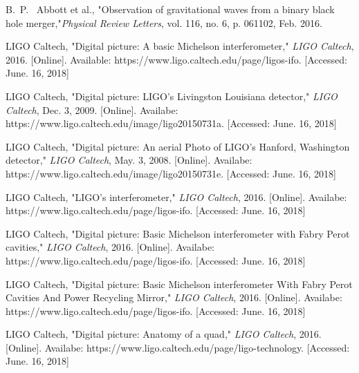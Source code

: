 \documentclass[journal,comsoc,twoside]{IEEEtran}
\begin{document}
%
%
%
\begin{thebibliography}{1}

B.~P.~ Abbott et al., "Observation of gravitational waves from a binary black hole merger,"\emph{Physical Review Letters}, vol. 116, no. 6, p. 061102, Feb. 2016.

LIGO Caltech, "Digital picture: A basic Michelson interferometer," \emph{LIGO Caltech}, 2016. [Online]. Available: https://www.ligo.caltech.edu/page/ligos-ifo. [Accessed: June. 16, 2018]

LIGO Caltech, "Digital picture: LIGO's Livingston Louisiana detector," \emph{LIGO Caltech}, Dec. 3, 2009. [Online]. Availabe: https://www.ligo.caltech.edu/image/ligo20150731a. [Accessed: June. 16, 2018]

LIGO Caltech, "Digital picture: An aerial Photo of LIGO's Hanford, Washington detector," \emph{LIGO Caltech}, May. 3, 2008. [Online]. Availabe: https://www.ligo.caltech.edu/image/ligo20150731e. [Accessed: June. 16, 2018]

LIGO Caltech, "LIGO's interferometer," \emph{LIGO Caltech}, 2016. [Online]. Availabe: https://www.ligo.caltech.edu/page/ligos-ifo. [Accessed: June. 16, 2018]

LIGO Caltech, "Digital picture: Basic Michelson interferometer with Fabry Perot cavities," \emph{LIGO Caltech}, 2016. [Online]. Availabe: https://www.ligo.caltech.edu/page/ligos-ifo. [Accessed: June. 16, 2018]

LIGO Caltech, "Digital picture: Basic Michelson interferometer With Fabry Perot Cavities And Power Recycling Mirror," \emph{LIGO Caltech}, 2016. [Online]. Availabe: https://www.ligo.caltech.edu/page/ligos-ifo. [Accessed: June. 16, 2018]

LIGO Caltech, "Digital picture: Anatomy of a quad," \emph{LIGO Caltech}, 2016. [Online]. Availabe: https://www.ligo.caltech.edu/page/ligo-technology. [Accessed: June. 16, 2018]


\end{thebibliography}
\end{document}
